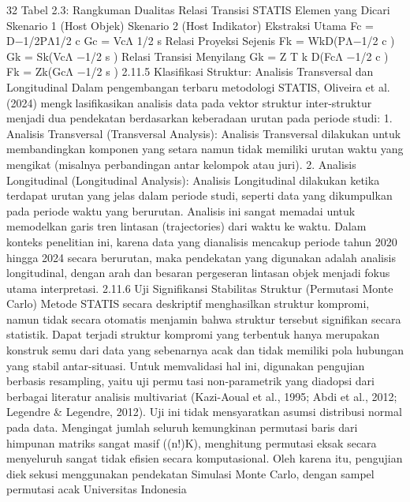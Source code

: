 32
Tabel 2.3: Rangkuman Dualitas Relasi Transisi STATIS
Elemen yang Dicari Skenario 1 (Host Objek) Skenario 2 (Host Indikator)
Ekstraksi Utama Fc = D−1/2PΛ1/2
c Gc = VcΛ
1/2
s
Relasi Proyeksi Sejenis Fk = WkD(PΛ−1/2
c ) Gk = Sk(VcΛ
−1/2
s )
Relasi Transisi Menyilang Gk = Z
T
k D(FcΛ
−1/2
c ) Fk = Zk(GcΛ
−1/2
s )
2.11.5 Klasifikasi Struktur: Analisis Transversal dan Longitudinal
Dalam pengembangan terbaru metodologi STATIS, Oliveira et al. (2024) mengklasifikasikan analisis data pada vektor struktur inter-struktur menjadi dua pendekatan
berdasarkan keberadaan urutan pada periode studi:
1. Analisis Transversal (Transversal Analysis): Analisis Transversal dilakukan untuk
membandingkan komponen yang setara namun tidak memiliki urutan waktu yang
mengikat (misalnya perbandingan antar kelompok atau juri).
2. Analisis Longitudinal (Longitudinal Analysis): Analisis Longitudinal dilakukan
ketika terdapat urutan yang jelas dalam periode studi, seperti data yang dikumpulkan
pada periode waktu yang berurutan. Analisis ini sangat memadai untuk memodelkan
garis tren lintasan (trajectories) dari waktu ke waktu.
Dalam konteks penelitian ini, karena data yang dianalisis mencakup periode tahun
2020 hingga 2024 secara berurutan, maka pendekatan yang digunakan adalah analisis
longitudinal, dengan arah dan besaran pergeseran lintasan objek menjadi fokus utama
interpretasi.
2.11.6 Uji Signifikansi Stabilitas Struktur (Permutasi Monte Carlo)
Metode STATIS secara deskriptif menghasilkan struktur kompromi, namun tidak
secara otomatis menjamin bahwa struktur tersebut signifikan secara statistik. Dapat
terjadi struktur kompromi yang terbentuk hanya merupakan konstruk semu dari data yang
sebenarnya acak dan tidak memiliki pola hubungan yang stabil antar-situasi.
Untuk memvalidasi hal ini, digunakan pengujian berbasis resampling, yaitu uji permutasi non-parametrik yang diadopsi dari berbagai literatur analisis multivariat (Kazi-Aoual
et al., 1995; Abdi et al., 2012; Legendre & Legendre, 2012). Uji ini tidak mensyaratkan
asumsi distribusi normal pada data. Mengingat jumlah seluruh kemungkinan permutasi
baris dari himpunan matriks sangat masif ((n!)K), menghitung permutasi eksak secara
menyeluruh sangat tidak efisien secara komputasional. Oleh karena itu, pengujian dieksekusi menggunakan pendekatan Simulasi Monte Carlo, dengan sampel permutasi acak
Universitas Indonesia

